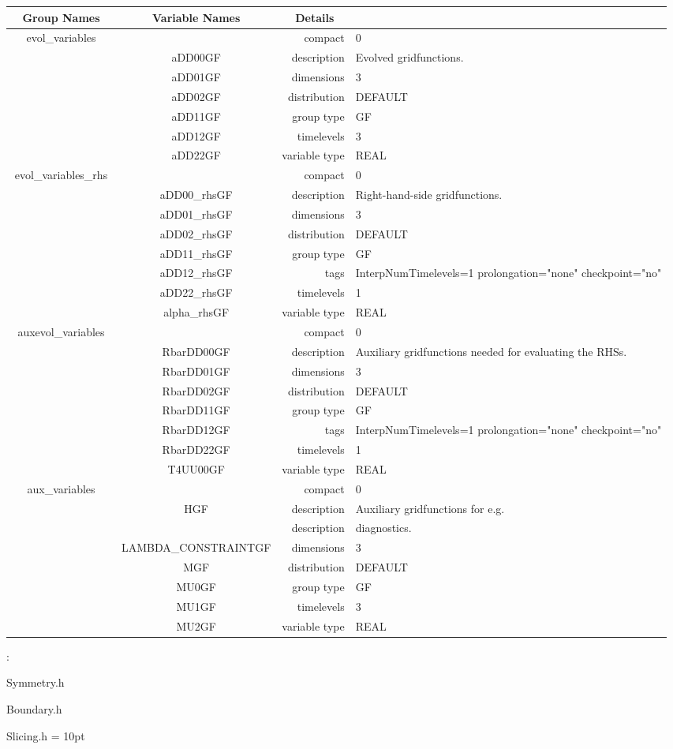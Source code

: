 \begin{tabular*}{150mm}{|c|c@{\extracolsep{\fill}}|rl|} \hline 
~ {\bf Group Names} ~ & ~ {\bf Variable Names} ~  &{\bf Details} ~ & ~\\ 
\hline 
evol\_variables &  & compact & 0 \\ 
 & aDD00GF & description & Evolved gridfunctions. \\ 
 & aDD01GF & dimensions & 3 \\ 
 & aDD02GF & distribution & DEFAULT \\ 
 & aDD11GF & group type & GF \\ 
 & aDD12GF & timelevels & 3 \\ 
 & aDD22GF & variable type & REAL \\ 
\hline 
evol\_variables\_rhs &  & compact & 0 \\ 
 & aDD00\_rhsGF & description & Right-hand-side gridfunctions. \\ 
 & aDD01\_rhsGF & dimensions & 3 \\ 
 & aDD02\_rhsGF & distribution & DEFAULT \\ 
 & aDD11\_rhsGF & group type & GF \\ 
 & aDD12\_rhsGF & tags & InterpNumTimelevels=1 prolongation="none" checkpoint="no" \\ 
 & aDD22\_rhsGF & timelevels & 1 \\ 
 & alpha\_rhsGF & variable type & REAL \\ 
\hline 
auxevol\_variables &  & compact & 0 \\ 
 & RbarDD00GF & description & Auxiliary gridfunctions needed for evaluating the RHSs. \\ 
 & RbarDD01GF & dimensions & 3 \\ 
 & RbarDD02GF & distribution & DEFAULT \\ 
 & RbarDD11GF & group type & GF \\ 
 & RbarDD12GF & tags & InterpNumTimelevels=1 prolongation="none" checkpoint="no" \\ 
 & RbarDD22GF & timelevels & 1 \\ 
 & T4UU00GF & variable type & REAL \\ 
\hline 
aux\_variables &  & compact & 0 \\ 
 & HGF & description & Auxiliary gridfunctions for e.g. \\ 
& ~ & description &  diagnostics. \\ 
 & LAMBDA\_CONSTRAINTGF & dimensions & 3 \\ 
 & MGF & distribution & DEFAULT \\ 
 & MU0GF & group type & GF \\ 
 & MU1GF & timelevels & 3 \\ 
 & MU2GF & variable type & REAL \\ 
\hline 
\end{tabular*} 



\vspace{5mm}

: 

Symmetry.h

Boundary.h

Slicing.h
\vspace{2mm}\parskip = 10pt 
